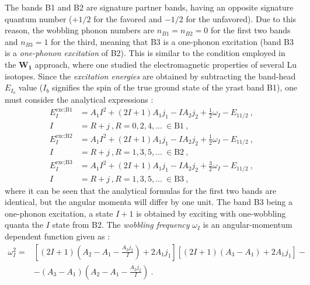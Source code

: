 The bands B1 and B2 are signature partner bands, having an opposite signature quantum number ($+1/2$ for the favored and $-1/2$ for the unfavored). Due to this reason, the wobbling phonon numbers are $n_{B1}=n_{B2}=0$ for the first two bands and $n_{B3}=1$ for the third, meaning that B3 is a one-phonon excitation (band B3 is a \emph{one-phonon excitation} of B2). This is similar to the condition employed in the $\mathbf{W_1}$ approach, where one studied the electromagnetic properties of several Lu isotopes. Since the \emph{excitation energies} are obtained by subtracting the band-head $E_{I_b}$ value ($I_b$ signifies the spin of the true ground state of the yrast band B1), one must consider the analytical expressions \cite{raduta2020new}:
\begin{align}
    E_I^\text{exc;B1}&=A_1I^2+(2I+1)A_1j_1-IA_2j_2+\frac{1}{2}\omega_I-E_{11/2}\ ,\nonumber\\
    I&=R+j\ ,R=0,2,4,\dots\ \in\text{B1}\ ,\nonumber\\
    E_I^\text{exc;B2}&=A_1I^2+(2I+1)A_1j_1-IA_2j_2+\frac{1}{2}\omega_I-E_{11/2}\ ,\nonumber\\
    I&=R+j\ ,R=1,3,5,\dots\ \in\text{B2}\ ,\nonumber\\
    E_I^\text{exc;B3}&=A_1I^2+(2I+1)A_1j_1-IA_2j_2+\frac{3}{2}\omega_I-E_{11/2}\ ,\nonumber\\
    I&=R+j\ ,R=1,3,5,\dots\ \in\text{B3}\ ,
    \label{excitation-energies-new-boson}
\end{align}
where it can be seen that the analytical formulas for the first two bands are identical, but the angular momenta will differ by one unit. The band B3 being a one-phonon excitation, a state $I+1$ is obtained by exciting with one-wobbling quanta the $I$ state from B2. The \emph{wobbling frequency} $\omega_I$ is an angular-momentum dependent function given as \cite{raduta2020new}:
\begin{align}
    \omega_I^2=&\left[(2I+1)\left(A_2-A_1-\frac{A_2j_2}{I}\right)+2A_1j_1\right]\left[(2I+1)(A_3-A_1)+2A_1j_1\right]-\nonumber\\
    &-(A_3-A_1)\left(A_2-A_1-\frac{A_2j_2}{I}\right)\ .
    \label{wobbling-frequency-new-boson}
\end{align}

